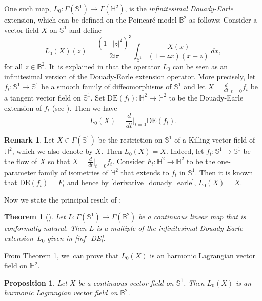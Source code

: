 \documentclass[10pt]{amsart}
\theoremstyle{plain}
\newtheorem{theorem}[cor]{Theorem}
\newtheorem{prop}[cor]{Proposition}
\theoremstyle{definition}
\newtheorem{remark}[cor]{Remark}
\begin{document}
One such map, $L_0:\Gamma(\mathbb{S}^1) \to \Gamma(\mathbb{H}^2)$, is the \emph{infinitesimal Douady-Earle} extension, which can be defined on the Poincaré model $\mathbb{B}^2$ as follows: Consider a vector field $X$ on $\mathbb{S}^1$ and define
\begin{equation}\label{inf_DE}
L_0(X)(z)=\frac{(1-\vert z\vert^2)^3}{2i\pi}\int_{\mathbb{S}^1}\frac{X(x)}{(1-\overline{z}x)(x-z)}\,dx,
\end{equation}
for all $z\in\mathbb{B}^2$. It~is explained in \cite{Uniqueness_of_operator_L} that the operator $L_0$ can be seen as an infinitesimal version of the Douady-Earle extension operator. More precisely, let \hbox{$f_t: \mathbb{S}^1 \to \mathbb{S}^1$} be a smooth family of diffeomorphisms of $\mathbb{S}^1$ and let $X = \frac{d}{dt}\big|_{t=0} f_t$ be a tangent vector field on $\mathbb{S}^1$. Set $\mathrm{DE}(f_t): \mathbb{H}^2 \to \mathbb{H}^2$ to be the Douady-Earle extension of $f_t$ (see \cite{Douady_Earle}). Then we have
\begin{equation}\label{derivative_douady_earle}
L_0(X)=\frac{d}{dt}\Big\lvert_{ t=0} \mathrm{DE}(f_t).
\end{equation}

\begin{remark}\label{douadyearly_killing}
Let $X \in \Gamma(\mathbb{S}^1)$ be the restriction on $\mathbb{S}^1$ of a Killing vector field of $\mathbb{H}^2$, which we also denote by $X$. Then $L_0(X)=X$. Indeed, let $f_t:\mathbb{S}^1\to\mathbb{S}^1$ be the flow of $X$ so that $X=\frac{d}{dt}\big\lvert_{t=0}f_t$. Consider $F_t: \mathbb{H}^2 \to \mathbb{H}^2$ to be the one-parameter family of isometries of $\mathbb{H}^2$ that extends to $f_t$ in $\mathbb{S}^1$. Then it is known that $\mathrm{DE}(f_t) = F_t$ and hence by \eqref{derivative_douady_earle}, $L_0(X)=X$.
\end{remark}
Now we state the principal result of \cite{Uniqueness_of_operator_L}:

\begin{theorem}[\cite{Uniqueness_of_operator_L}]\label{Uniqueness}
Let $L:\Gamma(\mathbb{S}^1) \to \Gamma(\mathbb{B}^2)$ be a continuous linear map that is conformally natural. Then $L$ is a multiple of the infinitesimal Douady-Earle extension~$L_0$ given in \eqref{inf_DE}.
\end{theorem}
From Theorem \ref{Uniqueness}, we~can prove that $L_0(X)$ is an harmonic Lagrangian vector field on $\mathbb{H}^2$.
\begin{prop}\label{L_0_harmonic_lagrangian}
Let $X$ be a continuous vector field on $\mathbb{S}^1$. Then $L_0(X)$ is an harmonic Lagrangian vector field on $\mathbb{B}^2$.
\end{prop}
\end{document}
